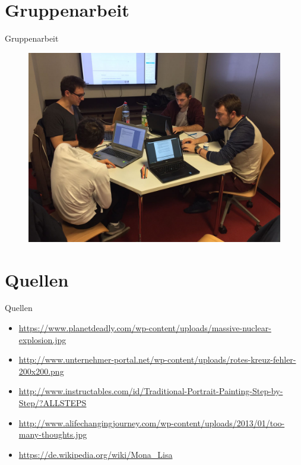\documentclass[19pt]{beamer}
\begin{document}
\section{Gruppenarbeit}
\begin{frame}{Gruppenarbeit}
	\begin{figure}
		\begin{center}
			\includegraphics[scale=0.16]{resources/Gruppenarbeit} 
		\end{center}
	\end{figure}	 
\end{frame}

\section{Quellen}
\begin{frame}{Quellen}
	\begin{itemize}
		\item \url{https://www.planetdeadly.com/wp-content/uploads/massive-nuclear-explosion.jpg}
		\item \url{http://www.unternehmer-portal.net/wp-content/uploads/rotes-kreuz-fehler-200x200.png}
		\item \url{http://www.instructables.com/id/Traditional-Portrait-Painting-Step-by-Step/?ALLSTEPS}
		\item \url{http://www.alifechangingjourney.com/wp-content/uploads/2013/01/too-many-thoughts.jpg}
		\item \url{https://de.wikipedia.org/wiki/Mona_Lisa}
	\end{itemize}	
\end{frame}
\end{document}
